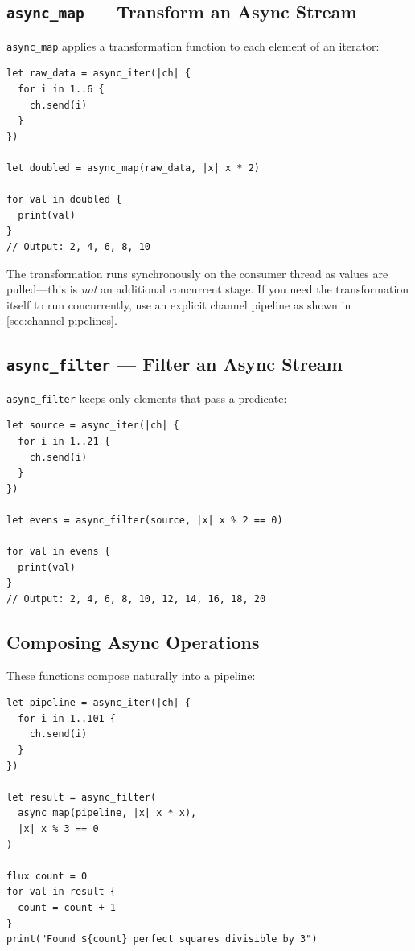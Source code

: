 \subsection{\texttt{async\_map} --- Transform an Async Stream}

\lstinline|async_map| applies a transformation function to each element of an iterator:

\begin{lstlisting}[language=Lattice, caption={Async map transformation}]
let raw_data = async_iter(|ch| {
  for i in 1..6 {
    ch.send(i)
  }
})

let doubled = async_map(raw_data, |x| x * 2)

for val in doubled {
  print(val)
}
// Output: 2, 4, 6, 8, 10
\end{lstlisting}

The transformation runs synchronously on the consumer thread as values are pulled---this is \emph{not} an additional concurrent stage.
If you need the transformation itself to run concurrently, use an explicit channel pipeline as shown in \cref{sec:channel-pipelines}.

\subsection{\texttt{async\_filter} --- Filter an Async Stream}

\lstinline|async_filter| keeps only elements that pass a predicate:

\begin{lstlisting}[language=Lattice, caption={Async filter}]
let source = async_iter(|ch| {
  for i in 1..21 {
    ch.send(i)
  }
})

let evens = async_filter(source, |x| x % 2 == 0)

for val in evens {
  print(val)
}
// Output: 2, 4, 6, 8, 10, 12, 14, 16, 18, 20
\end{lstlisting}

\subsection{Composing Async Operations}

These functions compose naturally into a pipeline:

\begin{lstlisting}[language=Lattice, caption={Composed async pipeline}]
let pipeline = async_iter(|ch| {
  for i in 1..101 {
    ch.send(i)
  }
})

let result = async_filter(
  async_map(pipeline, |x| x * x),
  |x| x % 3 == 0
)

flux count = 0
for val in result {
  count = count + 1
}
print("Found ${count} perfect squares divisible by 3")
\end{lstlisting}

